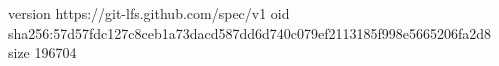 version https://git-lfs.github.com/spec/v1
oid sha256:57d57fdc127c8ceb1a73dacd587dd6d740c079ef2113185f998e5665206fa2d8
size 196704
